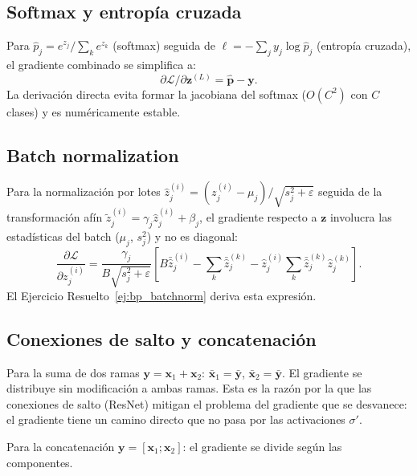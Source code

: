 
\subsection{Softmax y entropía cruzada}
\label{subsec:bp_softmax}

Para $\hat{p}_j = e^{z_j}/\sum_k e^{z_k}$ (softmax) seguida de
$\ell = -\sum_j y_j\log\hat{p}_j$ (entropía cruzada), el gradiente
combinado se simplifica a:
\begin{equation}
  \partial\mathcal{L}/\partial\bm{z}^{(L)} = \hat{\bm{p}} - \bm{y}.
  \label{eq:bp_softmax_ce}
\end{equation}
La derivación directa evita formar la jacobiana del softmax ($O(C^2)$ con
$C$ clases) y es numéricamente estable.

\subsection{Batch normalization}
\label{subsec:bp_bn}

Para la normalización por lotes $\hat{z}_j^{(i)} = (z_j^{(i)} -
\mu_j)/\sqrt{s_j^2+\varepsilon}$ seguida de la transformación afín
$\tilde{z}_j^{(i)} = \gamma_j\hat{z}_j^{(i)} + \beta_j$, el gradiente
respecto a $\bm{z}$ involucra las estadísticas del batch ($\mu_j$,
$s_j^2$) y no es diagonal:
\begin{equation}
  \frac{\partial\mathcal{L}}{\partial z_j^{(i)}}
  = \frac{\gamma_j}{B\sqrt{s_j^2+\varepsilon}}
  \left[B\bar{\hat{z}}_j^{(i)} - \sum_k\bar{\hat{z}}_j^{(k)}
  - \hat{z}_j^{(i)}\sum_k\bar{\hat{z}}_j^{(k)}\hat{z}_j^{(k)}\right].
  \label{eq:bp_bn}
\end{equation}
El Ejercicio Resuelto~\ref{ej:bp_batchnorm} deriva esta expresión.

\subsection{Conexiones de salto y concatenación}
\label{subsec:bp_skip}

Para la suma de dos ramas $\bm{y} = \bm{x}_1 + \bm{x}_2$:
$\bar{\bm{x}}_1 = \bar{\bm{y}}$, $\bar{\bm{x}}_2 = \bar{\bm{y}}$.
El gradiente se distribuye sin modificación a ambas ramas. Esta es la
razón por la que las conexiones de salto (ResNet) mitigan el problema del
gradiente que se desvanece: el gradiente tiene un camino directo que no
pasa por las activaciones $\sigma'$.

Para la concatenación $\bm{y} = [\bm{x}_1;\bm{x}_2]$: el gradiente se
divide según las componentes.

